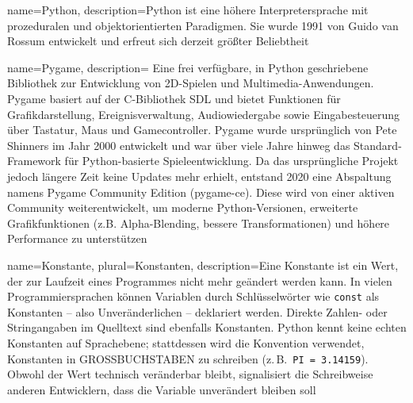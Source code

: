 
{
	name={Python},
	description={Python ist eine höhere Interpretersprache mit prozeduralen und objektorientierten Paradigmen. Sie wurde 1991 von Guido van Rossum entwickelt und erfreut sich derzeit größter Beliebtheit}
}

{
  name={Pygame},
  description={
  	Eine frei verfügbare, in Python geschriebene Bibliothek zur Entwicklung von 2D-Spielen und Multimedia-Anwendungen.	Pygame basiert auf der C-Bibliothek SDL und bietet Funktionen für Grafikdarstellung, Ereignisverwaltung, Audio\-wieder\-gabe sowie Eingabesteuerung über Tastatur, Maus und Gamecontroller.
  	Pygame wurde ursprünglich von Pete Shinners im Jahr 2000 entwickelt und war über viele Jahre hinweg das Standard-Framework für Python-basierte Spieleentwicklung. Da das ursprüngliche Projekt jedoch längere Zeit keine Updates mehr erhielt, entstand 2020 eine Abspaltung namens Pygame Community Edition (pygame-ce).
  	Diese wird von einer aktiven Community weiterentwickelt, um moderne Python-Versionen, erweiterte Grafikfunktionen (z.B. Alpha-Blending, bessere Transformationen) und höhere Performance zu unterstützen}
}


{
  name={Konstante},
  plural={Konstanten},
  description={Eine Konstante ist ein Wert, der zur Laufzeit eines Programmes nicht mehr geändert werden kann. In vielen Programmiersprachen können Variablen durch Schlüsselwörter wie \texttt{const} als Konstanten -- also Unveränderlichen -- deklariert werden. Direkte  Zahlen- oder Stringangaben im Quelltext sind ebenfalls Konstanten. 
  Python kennt keine echten Konstanten auf Sprachebene; stattdessen wird die Konvention verwendet, Konstanten in GROSSBUCHSTABEN zu schreiben (z.\,B.\ \texttt{PI = 3.14159}). Obwohl der Wert technisch veränderbar bleibt, signalisiert die Schreibweise anderen Entwicklern, dass die Variable unverändert bleiben soll}
}

